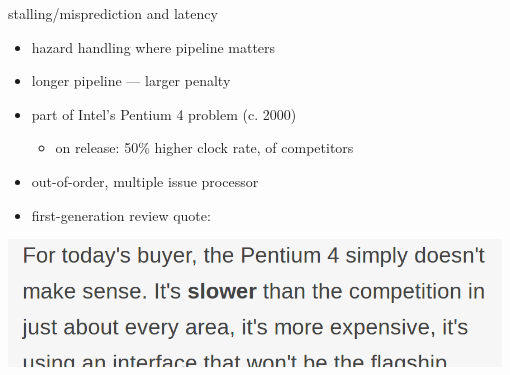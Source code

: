 \begin{frame}{stalling/misprediction and latency}
\begin{itemize}
    \item hazard handling where pipeline  matters
    \item longer pipeline --- larger penalty
    \item part of Intel's Pentium 4 problem (c. 2000)
    \begin{itemize}\item on release: 50\% higher clock rate,  of competitors\end{itemize}
    \item out-of-order, multiple issue processor
    \item first-generation review quote:
\end{itemize}
\includegraphics[width=0.98\textwidth]{../pipe/anand-p4-review}
\end{frame}

